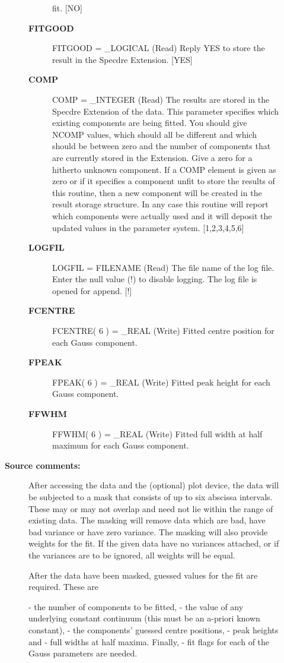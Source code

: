 \begin{description}
\begin{description}
\begin{description}
   fit. [NO]
\item [\textbf{FITGOOD}]
FITGOOD = \_LOGICAL (Read)
   Reply YES to store the result in the Specdre Extension. [YES]
\item [\textbf{COMP}]
COMP = \_INTEGER (Read)
   The results are stored in the Specdre Extension of the data.
   This parameter specifies which existing components are being
   fitted. You should give NCOMP values, which should all be
   different and which should be between zero and the number of
   components that are currently stored in the Extension. Give a
   zero for a hitherto unknown component. If a COMP element is
   given as zero or if it specifies a component unfit to store the
   results of this routine, then a new component will be created
   in the result storage structure. In any case this routine will
   report which components were actually used and it will deposit
   the updated values in the parameter system. [1,2,3,4,5,6]
\item [\textbf{LOGFIL}]
LOGFIL = FILENAME (Read)
   The file name of the log file. Enter the null value (!) to
   disable logging. The log file is opened for append. [!]
\item [\textbf{FCENTRE}]
FCENTRE( 6 ) = \_REAL (Write)
   Fitted centre position for each Gauss component.
\item [\textbf{FPEAK}]
FPEAK( 6 ) = \_REAL (Write)
   Fitted peak height for each Gauss component.
\item [\textbf{FFWHM}]
FFWHM( 6 ) = \_REAL (Write)
   Fitted full width at half maximum for each Gauss component.

\end{description}

\item [\textbf{Source comments:}]
\begin{terminalv}
   After accessing the data and the (optional) plot device, the data
   will be subjected to a mask that consists of up to six abscissa
   intervals. These may or may not overlap and need not lie within
   the range of existing data. The masking will remove data which are
   bad, have bad variance or have zero variance. The masking will
   also provide weights for the fit. If the given data have no
   variances attached, or if the variances are to be ignored, all
   weights will be equal.

   After the data have been masked, guessed values for the fit are
   required. These are

   -  the number of components to be fitted,
   -  the value of any underlying constant continuum (this must be an
      a-priori known constant),
   -  the components' guessed centre positions,
   -  peak heights and
   -  full widths at half maxima. Finally,
   -  fit flags for each of the Gauss parameters are needed.


\end{terminalv}
\end{description}
\end{description}
